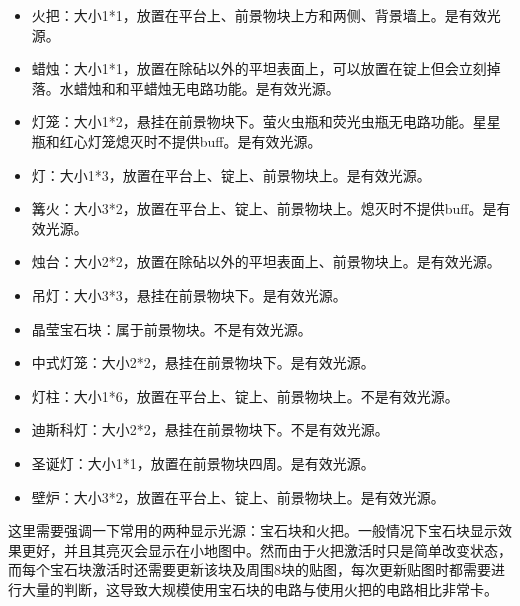 \begin{itemize}
\item 火把：大小1*1，放置在平台上、前景物块上方和两侧、背景墙上。是有效光源。
\item 蜡烛：大小1*1，放置在除砧以外的平坦表面上，可以放置在锭上但会立刻掉落。水蜡烛和和平蜡烛无电路功能。是有效光源。
\item 灯笼：大小1*2，悬挂在前景物块下。萤火虫瓶和荧光虫瓶无电路功能。星星瓶和红心灯笼熄灭时不提供buff。是有效光源。
\item 灯：大小1*3，放置在平台上、锭上、前景物块上。是有效光源。
\item 篝火：大小3*2，放置在平台上、锭上、前景物块上。熄灭时不提供buff。是有效光源。
\item 烛台：大小2*2，放置在除砧以外的平坦表面上、前景物块上。是有效光源。
\item 吊灯：大小3*3，悬挂在前景物块下。是有效光源。
\item 晶莹宝石块：属于前景物块。不是有效光源。
\item 中式灯笼：大小2*2，悬挂在前景物块下。是有效光源。
\item 灯柱：大小1*6，放置在平台上、锭上、前景物块上。不是有效光源。
\item 迪斯科灯：大小2*2，悬挂在前景物块下。不是有效光源。
\item 圣诞灯：大小1*1，放置在前景物块四周。是有效光源。
\item 壁炉：大小3*2，放置在平台上、锭上、前景物块上。是有效光源。
\end{itemize}

这里需要强调一下常用的两种显示光源：宝石块和火把。一般情况下宝石块显示效果更好，并且其亮灭会显示在小地图中。然而由于火把激活时只是简单改变状态，而每个宝石块激活时还需要更新该块及周围8块的贴图，每次更新贴图时都需要进行大量的判断，这导致大规模使用宝石块的电路与使用火把的电路相比非常卡。

